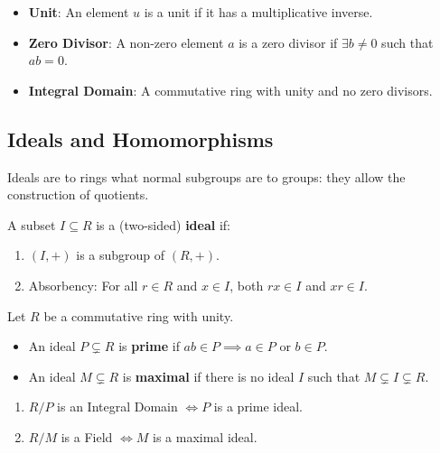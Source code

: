 \documentclass[oneside]{book}
\begin{document}
\begin{definition}
\begin{itemize}
    \item \textbf{Unit}: An element $u$ is a unit if it has a multiplicative inverse.
    \item \textbf{Zero Divisor}: A non-zero element $a$ is a zero divisor if $\exists b \neq 0$ such that $ab=0$.
    \item \textbf{Integral Domain}: A commutative ring with unity and no zero divisors.
\end{itemize}
\end{definition}

\subsection{Ideals and Homomorphisms}

Ideals are to rings what normal subgroups are to groups: they allow the construction of quotients.

\begin{definition}[Ideal]
A subset $I \subseteq R$ is a (two-sided) \textbf{ideal} if:
\begin{enumerate}
    \item $(I, +)$ is a subgroup of $(R, +)$.
    \item Absorbency: For all $r \in R$ and $x \in I$, both $rx \in I$ and $xr \in I$.
\end{enumerate}
\end{definition}

\begin{definition}
Let $R$ be a commutative ring with unity.
\begin{itemize}
    \item An ideal $P \subsetneq R$ is \textbf{prime} if $ab \in P \implies a \in P$ or $b \in P$.
    \item An ideal $M \subsetneq R$ is \textbf{maximal} if there is no ideal $I$ such that $M \subsetneq I \subsetneq R$.
\end{itemize}
\end{definition}

\begin{theorem}
\begin{enumerate}
    \item $R/P$ is an Integral Domain $\iff P$ is a prime ideal.
    \item $R/M$ is a Field $\iff M$ is a maximal ideal.
\end{enumerate}
\end{theorem}
\end{document}
